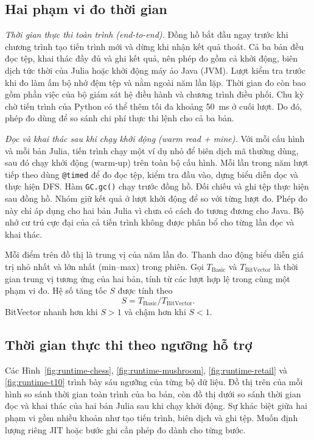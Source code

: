 \subsection{Hai phạm vi đo thời gian}
\textit{Thời gian thực thi toàn trình (end-to-end).} Đồng hồ bắt đầu
ngay trước khi chương trình tạo tiến trình mới và dừng khi nhận kết
quả thoát. Cả ba bản đều đọc tệp, khai thác đầy đủ và ghi kết quả,
nên phép đo gồm cả khởi động, biên dịch tức thời của Julia hoặc
khởi động máy ảo Java (JVM). Lượt kiểm tra trước khi đo làm ấm bộ
nhớ đệm tệp và nằm ngoài năm lần lặp. Thời gian đo còn bao gồm phần
việc của bộ giám sát hệ điều hành và chương trình điều phối. Chu kỳ
chờ tiến trình của Python có thể thêm tối đa khoảng 50~ms ở cuối
lượt. Do đó, phép đo dùng để so sánh chi phí thực thi lệnh cho cả
ba bản.

\textit{Đọc và khai thác sau khi chạy khởi động (warm read + mine).}
Với mỗi cấu hình và mỗi bản Julia, tiến trình chạy một ví dụ nhỏ để
biên dịch mã thường dùng, sau đó chạy khởi động (warm-up) trên toàn
bộ cấu hình. Mỗi lần trong năm lượt tiếp theo dùng \texttt{@timed}
để đo đọc tệp, kiểm tra đầu vào, dựng biểu diễn dọc và thực hiện
DFS. Hàm \texttt{GC.gc()} chạy trước đồng hồ. Đối chiếu và ghi tệp
thực hiện sau đồng hồ. Nhóm giữ kết quả ở lượt khởi động để so với
từng lượt đo. Phép đo này chỉ áp dụng cho hai bản Julia vì chưa có
cách đo tương đương cho Java. Bộ nhớ cư trú cực đại của cả tiến
trình không được phân bổ cho từng lần đọc và khai thác.

Mỗi điểm trên đồ thị là trung vị của năm lần đo. Thanh dao động
biểu diễn giá trị nhỏ nhất và lớn nhất (min--max) trong phiên.
Gọi $T_{\mathrm{Basic}}$ và $T_{\mathrm{BitVector}}$ là thời gian
trung vị tương ứng của hai bản, tính từ các lượt hợp lệ trong cùng
một phạm vi đo. Hệ số tăng tốc $S$ được tính theo
\begin{equation}
 S=T_{\mathrm{Basic}}/T_{\mathrm{BitVector}}.
 \label{eq:speedup}
\end{equation}
BitVector nhanh hơn khi $S>1$ và chậm hơn khi $S<1$.

\subsection{Thời gian thực thi theo ngưỡng hỗ trợ}
Các Hình~\ref{fig:runtime-chess}, \ref{fig:runtime-mushroom},
\ref{fig:runtime-retail} và \ref{fig:runtime-t10} trình bày sáu
ngưỡng của từng bộ dữ liệu. Đồ thị trên của mỗi hình so sánh thời
gian toàn trình của ba bản, còn đồ thị dưới so sánh thời gian đọc
và khai thác của hai bản Julia sau khi chạy khởi động. Sự khác biệt
giữa hai phạm vi gồm nhiều khoản như tạo tiến trình, biên dịch và
ghi tệp. Muốn định lượng riêng JIT hoặc bước ghi cần phép đo dành
cho từng bước.

